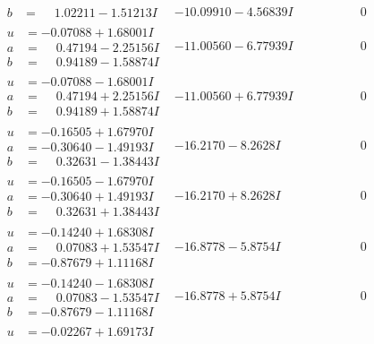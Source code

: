 \documentclass[1p]{elsarticle_modified}
\theoremstyle{definition}
\begin{document}
$$\begin{array}{c|c|c}
\begin{aligned}
b &= \phantom{-}1.02211 - 1.51213 I\end{aligned}
 & -10.09910 - 4.56839 I & \phantom{-0.000000 } 0 \\ \hline\begin{aligned}
u &= -0.07088 + 1.68001 I \\
a &= \phantom{-}0.47194 - 2.25156 I \\
b &= \phantom{-}0.94189 - 1.58874 I\end{aligned}
 & -11.00560 - 6.77939 I & \phantom{-0.000000 } 0 \\ \hline\begin{aligned}
u &= -0.07088 - 1.68001 I \\
a &= \phantom{-}0.47194 + 2.25156 I \\
b &= \phantom{-}0.94189 + 1.58874 I\end{aligned}
 & -11.00560 + 6.77939 I & \phantom{-0.000000 } 0 \\ \hline\begin{aligned}
u &= -0.16505 + 1.67970 I \\
a &= -0.30640 - 1.49193 I \\
b &= \phantom{-}0.32631 - 1.38443 I\end{aligned}
 & -16.2170 - 8.2628 I & \phantom{-0.000000 } 0 \\ \hline\begin{aligned}
u &= -0.16505 - 1.67970 I \\
a &= -0.30640 + 1.49193 I \\
b &= \phantom{-}0.32631 + 1.38443 I\end{aligned}
 & -16.2170 + 8.2628 I & \phantom{-0.000000 } 0 \\ \hline\begin{aligned}
u &= -0.14240 + 1.68308 I \\
a &= \phantom{-}0.07083 + 1.53547 I \\
b &= -0.87679 + 1.11168 I\end{aligned}
 & -16.8778 - 5.8754 I & \phantom{-0.000000 } 0 \\ \hline\begin{aligned}
u &= -0.14240 - 1.68308 I \\
a &= \phantom{-}0.07083 - 1.53547 I \\
b &= -0.87679 - 1.11168 I\end{aligned}
 & -16.8778 + 5.8754 I & \phantom{-0.000000 } 0 \\ \hline\begin{aligned}
u &= -0.02267 + 1.69173 I \\

\end{aligned}
\end{array}$$
\end{document}
